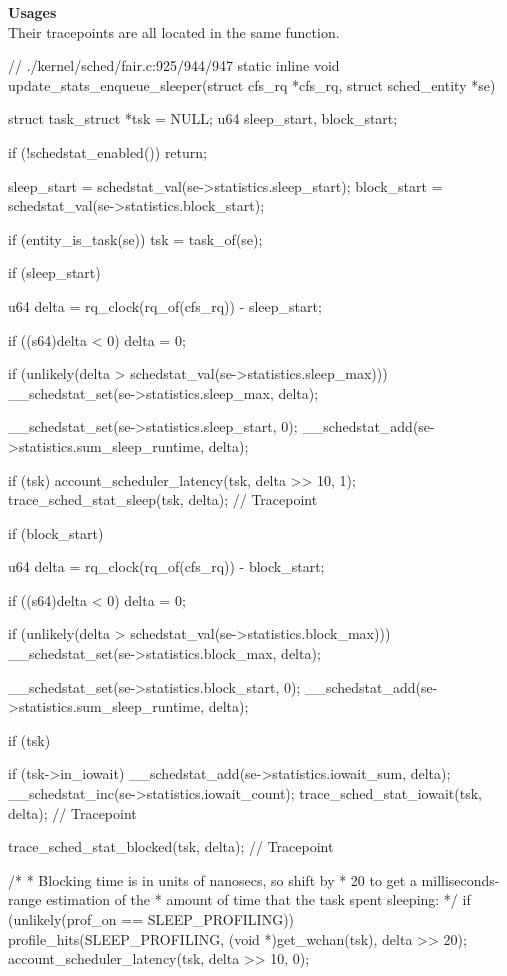 \textbf{Usages}\\
Their tracepoints are all located in the same function.
\begin{code}
// ./kernel/sched/fair.c:925/944/947
static inline void
update_stats_enqueue_sleeper(struct cfs_rq *cfs_rq, struct sched_entity *se) {
	struct task_struct *tsk = NULL;
	u64 sleep_start, block_start;

	if (!schedstat_enabled())
		return;

	sleep_start = schedstat_val(se->statistics.sleep_start);
	block_start = schedstat_val(se->statistics.block_start);

	if (entity_is_task(se))
		tsk = task_of(se);

	if (sleep_start) {
		u64 delta = rq_clock(rq_of(cfs_rq)) - sleep_start;

		if ((s64)delta < 0)
			delta = 0;

		if (unlikely(delta > schedstat_val(se->statistics.sleep_max)))
			__schedstat_set(se->statistics.sleep_max, delta);

		__schedstat_set(se->statistics.sleep_start, 0);
		__schedstat_add(se->statistics.sum_sleep_runtime, delta);

		if (tsk) {
			account_scheduler_latency(tsk, delta >> 10, 1);
			trace_sched_stat_sleep(tsk, delta); // Tracepoint
		}
	}
	if (block_start) {
		u64 delta = rq_clock(rq_of(cfs_rq)) - block_start;

		if ((s64)delta < 0)
			delta = 0;

		if (unlikely(delta > schedstat_val(se->statistics.block_max)))
			__schedstat_set(se->statistics.block_max, delta);

		__schedstat_set(se->statistics.block_start, 0);
		__schedstat_add(se->statistics.sum_sleep_runtime, delta);

		if (tsk) {
			if (tsk->in_iowait) {
				__schedstat_add(se->statistics.iowait_sum, delta);
				__schedstat_inc(se->statistics.iowait_count);
				trace_sched_stat_iowait(tsk, delta); // Tracepoint
			}

			trace_sched_stat_blocked(tsk, delta); // Tracepoint

			/*
			 * Blocking time is in units of nanosecs, so shift by
			 * 20 to get a milliseconds-range estimation of the
			 * amount of time that the task spent sleeping:
			 */
			if (unlikely(prof_on == SLEEP_PROFILING)) {
				profile_hits(SLEEP_PROFILING,
						(void *)get_wchan(tsk),
						delta >> 20);
			}
			account_scheduler_latency(tsk, delta >> 10, 0);
		}
	}
}
\end{code}

